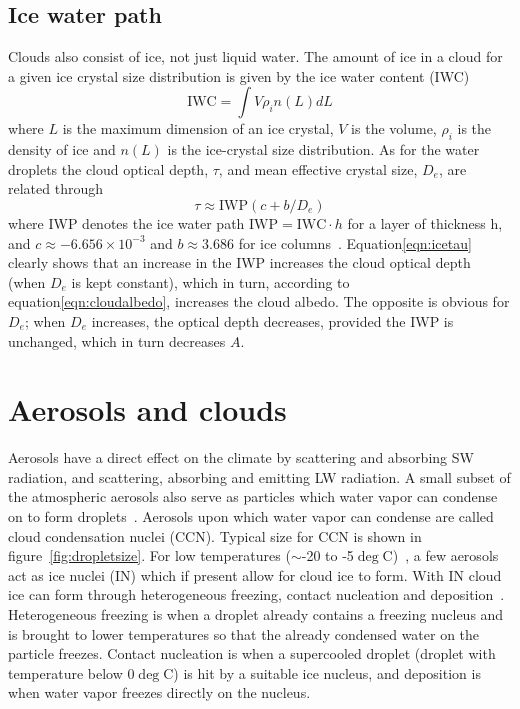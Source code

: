 \subsection{Ice water path}
 Clouds also consist of ice, not just liquid water. The amount of ice in a cloud for a given ice crystal size distribution is given by the ice water content (IWC)~\cite{Liou2002}
\begin{equation}
\text{IWC} = \int V \rho_i n(L)dL
\end{equation}
where $L$ is the maximum dimension of an ice crystal, $V$ is the volume, $\rho_i$ is the density of ice and $n(L)$ is the ice-crystal size distribution. As for the water droplets the cloud optical depth, $\tau$, and mean effective crystal size, $D_e$, are related through
\begin{equation}
\tau \approx \text{IWP}(c + b/D_e)
\label{eqn:icetau}
\end{equation}
where IWP denotes the ice water path $\text{IWP} = \text{IWC} \cdot h$ for a layer of thickness h, and $c \approx -6.656 \times 10^{-3}$ and $b \approx 3.686$ for ice columns~\citep{Liou2002}. Equation\ref{eqn:icetau} clearly shows that an increase in the IWP increases the cloud optical depth (when $D_e$ is kept constant), which in turn, according to equation\ref{eqn:cloudalbedo}, increases the cloud albedo. The opposite is obvious for $D_e$; when $D_e$ increases, the optical depth decreases, provided the IWP is unchanged, which in turn decreases $A$.

\section{Aerosols and clouds}
Aerosols have a direct effect on the climate by scattering and absorbing SW radiation, and scattering, absorbing and emitting LW radiation. A small subset of the atmospheric aerosols also serve as particles which water vapor can condense on to form droplets~\citep{Wallace2006}. Aerosols upon which water vapor can condense are called cloud condensation nuclei (CCN). Typical size for CCN is shown in figure~\ref{fig:dropletsize}. For low temperatures ($\sim$-20 to -5$\deg$C)~\citep{Wallace2006}, a few aerosols act as ice nuclei (IN) which if present allow for cloud ice to form. With IN cloud ice can form through heterogeneous freezing, contact nucleation and deposition~\citep{Wallace2006}. Heterogeneous freezing is when a droplet already contains a freezing nucleus and is brought to lower temperatures so that the already condensed water on the particle freezes. Contact nucleation is when a supercooled droplet (droplet with temperature below 0$\deg$C) is hit by a suitable ice nucleus, and deposition is when water vapor freezes directly on the nucleus.

